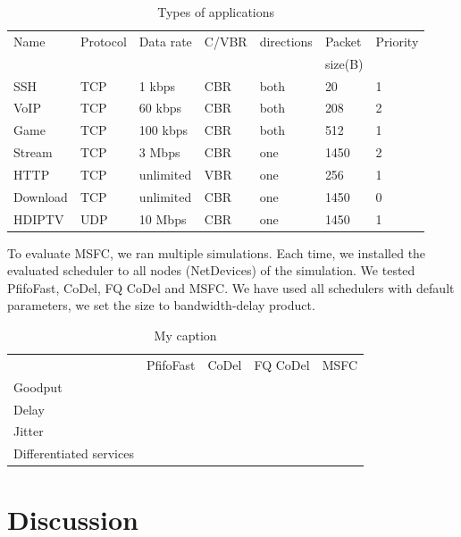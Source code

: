 \begin{table}
	\caption{Types of applications}
	\label{tab01:traffic}
	\centering
	
	
	\begin{tabular}{@{}lllllll@{}}
		\toprule
		Name     & Protocol & Data rate & C/VBR   & directions & Packet         & Priority \\ 
		&          &           &         &            & size(B)        & \\ \midrule
		SSH      & TCP      & 1 kbps    & CBR     & both       & 20             & 1        \\
		VoIP     & TCP      & 60 kbps   & CBR     & both       & 208            & 2        \\
		Game     & TCP      & 100 kbps  & CBR     & both       & 512            & 1        \\
		Stream   & TCP      & 3 Mbps    & CBR     & one        & 1450           & 2        \\
		HTTP     & TCP      & unlimited & VBR     & one        & 256            & 1        \\
		Download & TCP      & unlimited & CBR     & one        & 1450           & 0        \\
		HDIPTV   & UDP      & 10 Mbps   & CBR     & one        & 1450           & 1        \\ \bottomrule
	\end{tabular}
\end{table}


To evaluate MSFC, we ran multiple simulations. Each time, we installed the evaluated scheduler to all nodes (NetDevices) of the simulation. We tested PfifoFast, CoDel, FQ CoDel and MSFC. We have used all schedulers with default parameters, we set the size to bandwidth-delay product. 



\begin{table}[]
	\centering
	\caption{My caption}
	\label{my-label}
	\begin{tabular}{lllll}
		& PfifoFast & CoDel & FQ CoDel & MSFC \\
		Goodput                 &           &       &          &      \\
		Delay                   &           &       &          &      \\
		Jitter                  &           &       &          &      \\
		Differentiated services &           &       &          &     
	\end{tabular}
\end{table}







\section{Discussion}